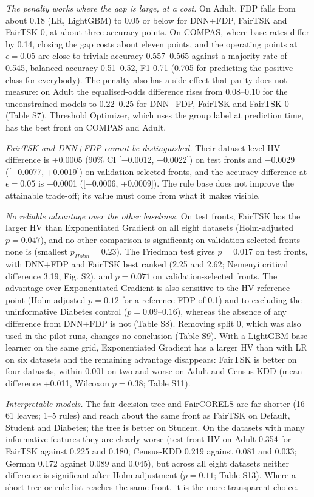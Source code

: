 \emph{The penalty works where the gap is large, at a cost.} On Adult, FDP falls from about 0.18 (LR, LightGBM) to 0.05 or below for DNN+FDP, FairTSK and FairTSK-0, at about three accuracy points. On COMPAS, where base rates differ by 0.14, closing the gap costs about eleven points, and the operating points at \(\epsilon = 0.05\) are close to trivial: accuracy 0.557--0.565 against a majority rate of 0.545, balanced accuracy 0.51--0.52, F1 0.71 (0.705 for predicting the positive class for everybody). The penalty also has a side effect that parity does not measure: on Adult the equalised-odds difference rises from 0.08--0.10 for the unconstrained models to 0.22--0.25 for DNN+FDP, FairTSK and FairTSK-0 (Table S7). Threshold Optimizer, which uses the group label at prediction time, has the best front on COMPAS and Adult.

\emph{FairTSK and DNN+FDP cannot be distinguished.} Their dataset-level HV difference is +0.0005 (90\% CI {[}−0.0012, +0.0022{]}) on test fronts and −0.0029 ({[}−0.0077, +0.0019{]}) on validation-selected fronts, and the accuracy difference at \(\epsilon = 0.05\) is +0.0001 ({[}−0.0006, +0.0009{]}). The rule base does not improve the attainable trade-off; its value must come from what it makes visible.

\emph{No reliable advantage over the other baselines.} On test fronts, FairTSK has the larger HV than Exponentiated Gradient on all eight datasets (Holm-adjusted \(p = 0.047\)), and no other comparison is significant; on validation-selected fronts none is (smallest \(p_{Holm} = 0.23\)). The Friedman test gives \(p = 0.017\) on test fronts, with DNN+FDP and FairTSK best ranked (2.25 and 2.62; Nemenyi critical difference 3.19, Fig. S2), and \(p = 0.071\) on validation-selected fronts. The advantage over Exponentiated Gradient is also sensitive to the HV reference point (Holm-adjusted \(p = 0.12\) for a reference FDP of 0.1) and to excluding the uninformative Diabetes control (\(p = 0.09\)--\(0.16\)), whereas the absence of any difference from DNN+FDP is not (Table S8). Removing split 0, which was also used in the pilot runs, changes no conclusion (Table S9). With a LightGBM base learner on the same grid, Exponentiated Gradient has a larger HV than with LR on six datasets and the remaining advantage disappears: FairTSK is better on four datasets, within 0.001 on two and worse on Adult and Census-KDD (mean difference +0.011, Wilcoxon \(p = 0.38\); Table S11).

\emph{Interpretable models.} The fair decision tree and FairCORELS are far shorter (16--61 leaves; 1--5 rules) and reach about the same front as FairTSK on Default, Student and Diabetes; the tree is better on Student. On the datasets with many informative features they are clearly worse (test-front HV on Adult 0.354 for FairTSK against 0.225 and 0.180; Census-KDD 0.219 against 0.081 and 0.033; German 0.172 against 0.089 and 0.045), but across all eight datasets neither difference is significant after Holm adjustment (\(p = 0.11\); Table S13). Where a short tree or rule list reaches the same front, it is the more transparent choice.

